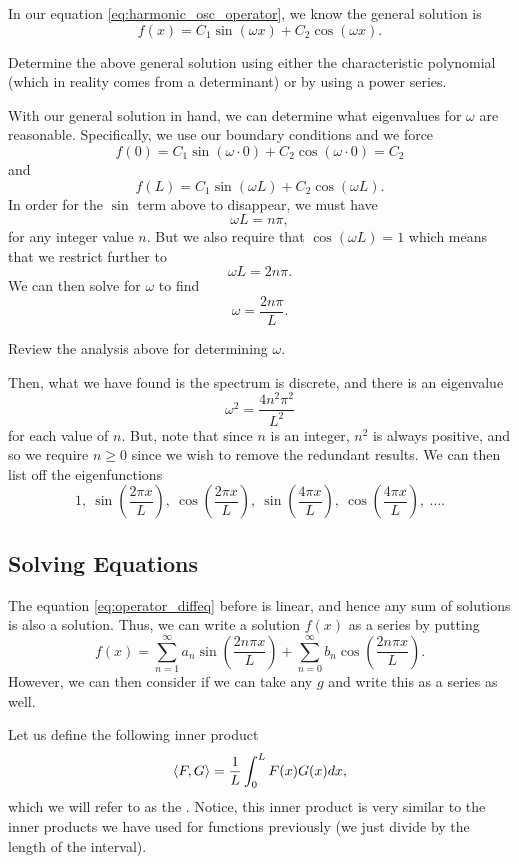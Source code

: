 In our equation \ref{eq:harmonic_osc_operator}, we know the general solution is
\[
f(x) = C_1 \sin(\omega x)+C_2 \cos(\omega x).  
\]

\begin{exercise}
	Determine the above general solution using either the characteristic polynomial (which in reality comes from a determinant) or by using a power series.
\end{exercise}

With our general solution in hand, we can determine what eigenvalues for $\omega$ are reasonable.  Specifically, we use our boundary conditions and we force
\[
f(0)=C_1 \sin(\omega \cdot 0) + C_2 \cos(\omega \cdot 0) = C_2
\]
and
\[
f(L) = C_1 \sin(\omega L) + C_2 \cos(\omega L).
\]
In order for the $\sin$ term above to disappear, we must have
\[
\omega L = n \pi,
\]
for any integer value $n$. But we also require that $\cos(\omega L)=1$ which means that we restrict further to
\[
\omega L = 2n\pi.  
\]
We can then solve for $\omega$ to find
\[
\boxed{\omega = \frac{2n\pi}{L}.}
\]

\begin{exercise}
	Review the analysis above for determining $\omega$.
\end{exercise}

Then, what we have found is the spectrum is discrete, and there is an eigenvalue 
\[
\omega^2 = \frac{4 n^2 \pi^2}{L^2}
\]
for each value of $n$.  But, note that since $n$ is an integer, $n^2$ is always positive, and so we require $n\geq 0$ since we wish to remove the redundant results.  We can then list off the eigenfunctions
\[
\boxed{1,~\sin\left(\frac{2 \pi x}{L}\right),~ \cos\left(\frac{2 \pi x}{L}\right), ~\sin\left(\frac{4 \pi x}{L}\right),~ \cos\left(\frac{4 \pi x}{L}\right), ~ \dots.}
\]

\subsection{Solving Equations}

The equation \ref{eq:operator_diffeq} before is linear, and hence any sum of solutions is also a solution.  Thus, we can write a solution $f(x)$ as a series by putting
\[
f(x) = \sum_{n=1}^\infty a_n \sin\left(\frac{2n\pi x}{L}\right) + \sum_{n=0}^\infty b_n \cos\left(\frac{2n\pi x}{L} \right).
\]
However, we can then consider if we can take any $g$ and write this as a series as well. 

Let us define the following inner product
\[
\left\langle F, G \right\rangle = \frac{1}{L} \int_0^L F(x)G(x)dx,
\]
which we will refer to as the .  Notice, this inner product is very similar to the inner products we have used for functions previously (we just divide by the length of the interval).

